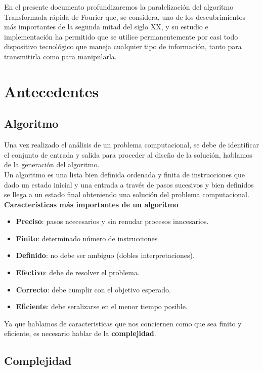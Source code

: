 \documentclass{article}
\begin{document}
En el presente documento profundizaremos la paralelización del algoritmo Transformada rápida de Fourier que, se considera, uno de los descubrimientos más importantes de la segunda mitad del siglo XX, y su estudio e implementación ha permitido que se utilice permanentemente por casi todo dispositivo tecnológico que maneja cualquier tipo de información, tanto para transmitirla como para manipularla.
\newpage
\section{Antecedentes}
\subsection{Algoritmo}
Una vez realizado el análisis de un problema computacional, se debe de identificar el conjunto de entrada y salida para proceder al diseño de la solución, hablamos de la generación del algoritmo.\\

Un algoritmo es una lista bien definida ordenada y finita de instrucciones que dado un estado inicial y una entrada a través de pasos sucesivos y bien definidos se llega a un estado final obteniendo una solución del problema computacional.\\

\textbf{Características más importantes de un algoritmo}
\begin{itemize}
    \item \textbf{Preciso}: pasos ncecesarios y sin renudar procesos inncesarios.
    \item \textbf{Finito}: determinado número de instrucciones
    \item \textbf{Definido}: no debe ser ambiguo (dobles interpretaciones).
    \item \textbf{Efectivo}: debe de resolver el problema.
    \item \textbf{Correcto}: debe cumplir con el objetivo esperado.
    \item \textbf{Eficiente}: debe seralizarse en el menor tiempo posible. 
\end{itemize}
Ya que hablamos de caracteristicas que nos conciernen como que sea finito y eficiente, es necesario hablar de la \textbf{complejidad}. 

\subsection{Complejidad}
\end{document}
